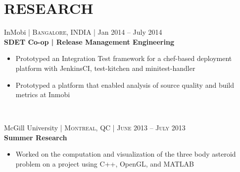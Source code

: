 \documentclass[10pt]{article} %
\begin{document}
{\begin{minipage}[t]{0.57\textwidth}

\section{\uppercase{\textbf{Research}}}



{\raggedright\large InMobi \normalsize\textsc{ | Bangalore, INDIA} | Jan 2014 -- July 2014\\
\textbf{SDET Co-op | Release Management Engineering}\\[5pt]}
\vspace{0pt}
\begin{itemize}\itemsep-0.25em
    \item Prototyped an Integration Test framework for a chef-based deployment platform with JenkinsCI, test-kitchen and minitest-handler
    \item Prototyped a platform that enabled analysis of source quality and build metrics at Inmobi
\end{itemize}\\



{\raggedright\large McGill University \normalsize\textsc{ | Montreal, QC | June 2013 -- July 2013}\\
\textbf{Summer Research}\\[5pt]}
\begin{itemize}\itemsep-0.25em
    \item Worked on the computation and visualization of the three body asteroid problem on a project using C++, OpenGL, and MATLAB
\end{itemize}\\



\end{minipage}}
\end{document}
